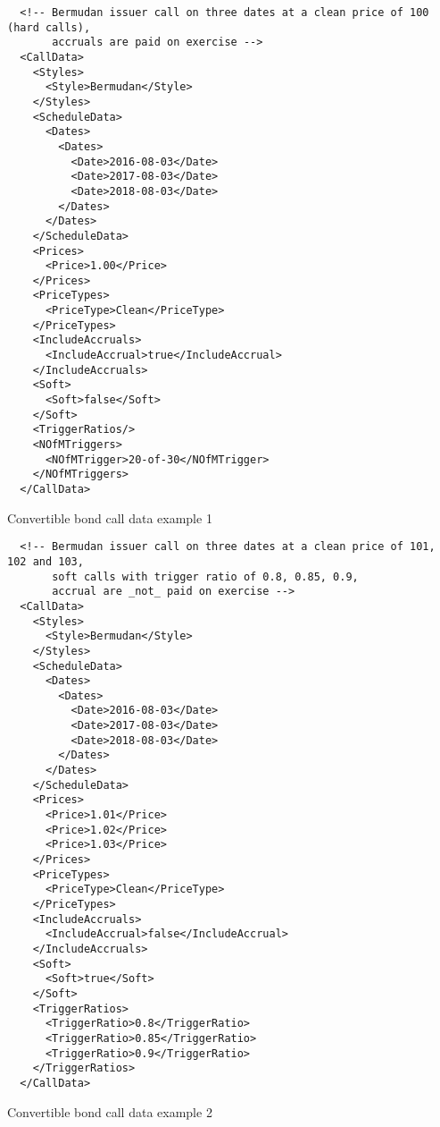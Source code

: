 \begin{listing}[H]
\begin{verbatim}
  <!-- Bermudan issuer call on three dates at a clean price of 100 (hard calls),
       accruals are paid on exercise -->
  <CallData>
    <Styles>
      <Style>Bermudan</Style>
    </Styles>
    <ScheduleData>
      <Dates>
        <Dates>
          <Date>2016-08-03</Date>
          <Date>2017-08-03</Date>
          <Date>2018-08-03</Date>
        </Dates>
      </Dates>
    </ScheduleData>
    <Prices>
      <Price>1.00</Price>
    </Prices>
    <PriceTypes>
      <PriceType>Clean</PriceType>
    </PriceTypes>
    <IncludeAccruals>
      <IncludeAccrual>true</IncludeAccrual>
    </IncludeAccruals>
    <Soft>
      <Soft>false</Soft>
    </Soft>
    <TriggerRatios/>
    <NOfMTriggers>
      <NOfMTrigger>20-of-30</NOfMTrigger>
    </NOfMTriggers>
  </CallData>
\end{verbatim}
\caption{Convertible bond call data example 1}
\label{lst:convertiblebonddata_callputdata_1}
\end{listing}

\begin{listing}[H]
\begin{verbatim}
  <!-- Bermudan issuer call on three dates at a clean price of 101, 102 and 103,
       soft calls with trigger ratio of 0.8, 0.85, 0.9,
       accrual are _not_ paid on exercise -->
  <CallData>
    <Styles>
      <Style>Bermudan</Style>
    </Styles>
    <ScheduleData>
      <Dates>
        <Dates>
          <Date>2016-08-03</Date>
          <Date>2017-08-03</Date>
          <Date>2018-08-03</Date>
        </Dates>
      </Dates>
    </ScheduleData>
    <Prices>
      <Price>1.01</Price>
      <Price>1.02</Price>
      <Price>1.03</Price>
    </Prices>
    <PriceTypes>
      <PriceType>Clean</PriceType>
    </PriceTypes>
    <IncludeAccruals>
      <IncludeAccrual>false</IncludeAccrual>
    </IncludeAccruals>
    <Soft>
      <Soft>true</Soft>
    </Soft>
    <TriggerRatios>
      <TriggerRatio>0.8</TriggerRatio>
      <TriggerRatio>0.85</TriggerRatio>
      <TriggerRatio>0.9</TriggerRatio>
    </TriggerRatios>
  </CallData>
\end{verbatim}
\caption{Convertible bond call data example 2}
\label{lst:convertiblebonddata_callputdata_2}
\end{listing}


